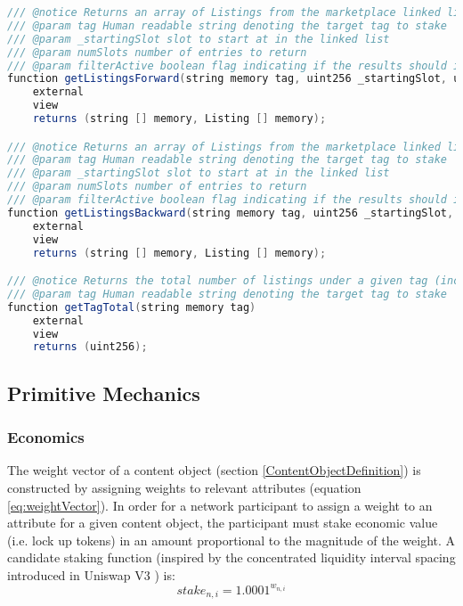 \begin{lstlisting}[language=Java, caption=a minimal interface for reading and writing to the global ranking namespace]
/// @notice Returns an array of Listings from the marketplace linked list from highest to lowest ranked
/// @param tag Human readable string denoting the target tag to stake
/// @param _startingSlot slot to start at in the linked list
/// @param numSlots number of entries to return
/// @param filterActive boolean flag indicating if the results should include expired listings (false) or not (true)
function getListingsForward(string memory tag, uint256 _startingSlot, uint256 numSlots, bool filterActive) 
    external 
    view 
    returns (string [] memory, Listing [] memory);

/// @notice Returns an array of Listings from the marketplace linked list from lowest to highest ranked
/// @param tag Human readable string denoting the target tag to stake
/// @param _startingSlot slot to start at in the linked list
/// @param numSlots number of entries to return
/// @param filterActive boolean flag indicating if the results should include expired listings (false) or not (true)
function getListingsBackward(string memory tag, uint256 _startingSlot, uint256 numSlots, bool filterActive);
    external 
    view 
    returns (string [] memory, Listing [] memory);

/// @notice Returns the total number of listings under a given tag (including expired listings which have not been removed)
/// @param tag Human readable string denoting the target tag to stake
function getTagTotal(string memory tag)
    external 
    view 
    returns (uint256);
\end{lstlisting}

\subsection{Primitive Mechanics}
\label{PrimitiveMechanics}

\subsubsection{Economics}
The weight vector of a content object (section \ref{ContentObjectDefinition}) is constructed by assigning weights to relevant attributes (equation \ref{eq:weightVector}). In order for a network participant to assign a weight to an attribute for a given content object, the participant must stake economic value (i.e. lock up tokens) in an amount proportional to the magnitude of the weight. A candidate staking function (inspired by the concentrated liquidity interval spacing introduced in Uniswap V3 \cite{adams2021uniswap}) is: 
\begin{equation}
\label{eq:stakefunction}
    stake_{n,i} = 1.0001^{w_{n,i}}
\end{equation}

